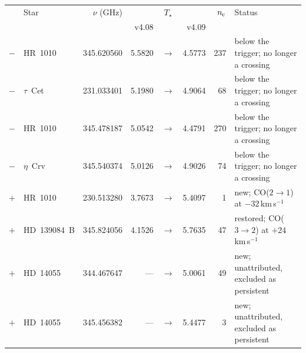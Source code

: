 \begin{tabular}{@{}l@{~}l@{~~}r@{~~}r@{~}c@{~}r@{~~}r@{~~}l@{}}
\hline
& Star & $\nu$ (GHz) & \multicolumn{3}{c}{$T_\star$} & $n_{\rm c}$ & Status \\
& & & v4.08 & & v4.09 & & \\
\hline
$-$ & HR~1010 & 345.620560 & 5.5820 & $\to$ & 4.5773 & 237 & below the trigger; no longer a crossing \\
$-$ & $\tau$~Cet & 231.033401 & 5.1980 & $\to$ & 4.9064 & 68 & below the trigger; no longer a crossing \\
$-$ & HR~1010 & 345.478187 & 5.0542 & $\to$ & 4.4791 & 270 & below the trigger; no longer a crossing \\
$-$ & $\eta$~Crv & 345.540374 & 5.0126 & $\to$ & 4.9026 & 74 & below the trigger; no longer a crossing \\
$+$ & HR~1010 & 230.513280 & 3.7673 & $\to$ & 5.4097 & 1 & new; CO($2{\to}1$) at $-32$\,km\,s$^{-1}$ \\
$+$ & HD~139084~B & 345.824056 & 4.1526 & $\to$ & 5.7635 & 47 & restored; CO($3{\to}2$) at $+24$\,km\,s$^{-1}$ \\
$+$ & HD~14055 & 344.467647 & --- & $\to$ & 5.0061 & 49 & new; unattributed, excluded as persistent \\
$+$ & HD~14055 & 345.456382 & --- & $\to$ & 5.4477 & 3 & new; unattributed, excluded as persistent \\
\hline
\end{tabular}
